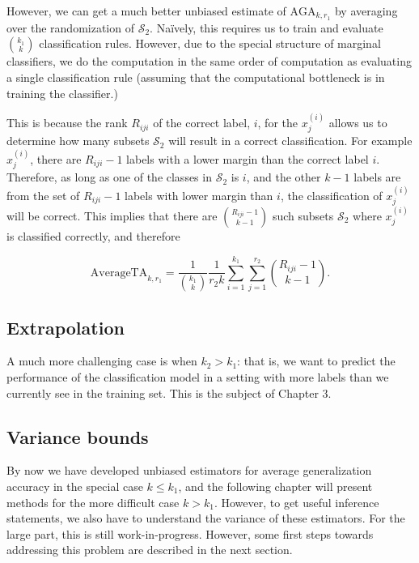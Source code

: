 However, we can get a much better unbiased estimate of
$\text{AGA}_{k, r_1}$ by averaging over the randomization of
$\mathcal{S}_2$.  Na\"{i}vely, this requires us to train and evaluate
${k_1}\choose{k}$ classification rules.  However, due to the special
structure of marginal classifiers, we do the computation in the same
order of computation as evaluating a single classification rule
(assuming that the computational bottleneck is in training the
classifier.)

This is because the rank $R_{iji}$ of the correct label, $i$, for the
$x_j^{(i)}$ allows us to determine how many subsets $\mathcal{S}_2$
will result in a correct classification.  For example $x_j^{(i)}$,
there are $R_{iji} - 1$ labels with a lower margin than the correct
label $i$.  Therefore, as long as one of the classes in
$\mathcal{S}_2$ is $i$, and the other $k-1$ labels are from the set of
$R_{iji}-1$ labels with lower margin than $i$, the classification of
$x_j^{(i)}$ will be correct.  This implies that there are
${R_{iji}-1}\choose{k-1}$ such subsets $\mathcal{S}_2$ where
$x_j^{(i)}$ is classified correctly, and therefore

\begin{equation}\label{eq:avtestrisk}
\text{AverageTA}_{k, r_1} = \frac{1}{{{k_1}\choose{k}}}\frac{1}{r_2 k} \sum_{i=1}^{k_1} \sum_{j=1}^{r_2} {{R_{iji}-1}\choose{k-1}}.
\end{equation}

\subsection{Extrapolation}

A much more challenging case is when $k_2 > k_1$: that is, we want to
predict the performance of the classification model in a setting with
more labels than we currently see in the training set.  This is the
subject of Chapter 3.

\subsection{Variance bounds}

By now we have developed unbiased estimators for average generalization accuracy in the
special case $k \leq k_1$, and the following chapter will present
methods for the more difficult case $k > k_1$.  However, to get useful
inference statements, we also have to understand the variance of these
estimators.  For the large part, this is still work-in-progress.
However, some first steps towards addressing this problem are
described in the next section.

